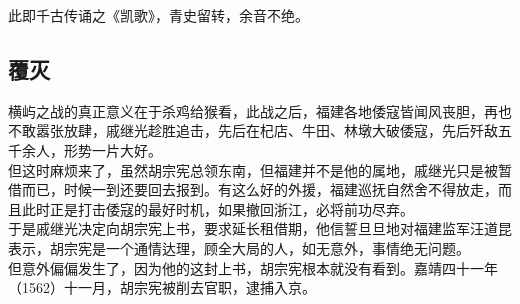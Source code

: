 \begin{multicols}{\theparacolNo}
此即千古传诵之《凯歌》，青史留转，余音不绝。\\

\subsection{覆灭}
横屿之战的真正意义在于杀鸡给猴看，此战之后，福建各地倭寇皆闻风丧胆，再也不敢嚣张放肆，戚继光趁胜追击，先后在杞店、牛田、林墩大破倭寇，先后歼敌五千余人，形势一片大好。\\

但这时麻烦来了，虽然胡宗宪总领东南，但福建并不是他的属地，戚继光只是被暂借而已，时候一到还要回去报到。有这么好的外援，福建巡抚自然舍不得放走，而且此时正是打击倭寇的最好时机，如果撤回浙江，必将前功尽弃。\\

于是戚继光决定向胡宗宪上书，要求延长租借期，他信誓旦旦地对福建监军汪道昆表示，胡宗宪是一个通情达理，顾全大局的人，如无意外，事情绝无问题。\\

但意外偏偏发生了，因为他的这封上书，胡宗宪根本就没有看到。嘉靖四十一年（1562）十一月，胡宗宪被削去官职，逮捕入京。\\
\ifnum{}
	\end{multicols}
\fi
\newpage
